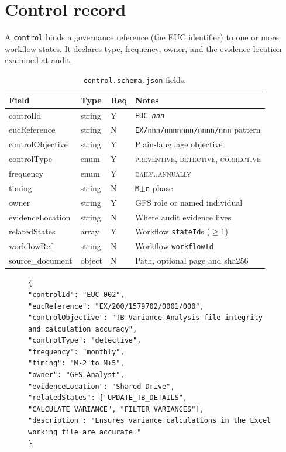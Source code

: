 \documentclass[11pt,a4paper,twoside]{report}
\begin{document}
\section{Control record}\label{sec:control-schema}

A \texttt{control} binds a governance reference (the EUC identifier) to
one or more workflow states. It declares type, frequency, owner, and
the evidence location examined at audit.

\begin{table}[htbp]
\caption{\texttt{control.schema.json} fields.}\label{tab:control-fields}
\centering
\small
\begin{tabularx}{\linewidth}{@{}lllX@{}}
\toprule
\textbf{Field} & \textbf{Type} & \textbf{Req} & \textbf{Notes} \\ \midrule
controlId        & string  & Y & \texttt{EUC-\textit{nnn}} \\
eucReference     & string  & N & \texttt{EX/nnn/nnnnnnn/nnnn/nnn} pattern \\
controlObjective & string  & Y & Plain-language objective \\
controlType      & enum    & Y & \textsc{preventive}, \textsc{detective}, \textsc{corrective} \\
frequency        & enum    & Y & \textsc{daily}..\textsc{annually} \\
timing           & string  & N & \texttt{M$\pm$n} phase \\
owner            & string  & Y & GFS role or named individual \\
evidenceLocation & string  & N & Where audit evidence lives \\
relatedStates    & array   & Y & Workflow \texttt{stateId}s ($\ge$1) \\
workflowRef      & string  & N & Workflow \texttt{workflowId} \\
source\_document & object  & N & Path, optional page and sha256 \\
\bottomrule
\end{tabularx}
\end{table}

\begin{figure}[htbp]
\begin{lstlisting}[language=jsonx,caption={\texttt{EUC-002} variance-file
control record (abbreviated).},label=lst:euc-002]
{
"controlId": "EUC-002",
"eucReference": "EX/200/1579702/0001/000",
"controlObjective": "TB Variance Analysis file integrity and calculation accuracy",
"controlType": "detective",
"frequency": "monthly",
"timing": "M-2 to M+5",
"owner": "GFS Analyst",
"evidenceLocation": "Shared Drive",
"relatedStates": ["UPDATE_TB_DETAILS", "CALCULATE_VARIANCE", "FILTER_VARIANCES"],
"description": "Ensures variance calculations in the Excel working file are accurate."
}
\end{lstlisting}
\end{figure}
\end{document}
